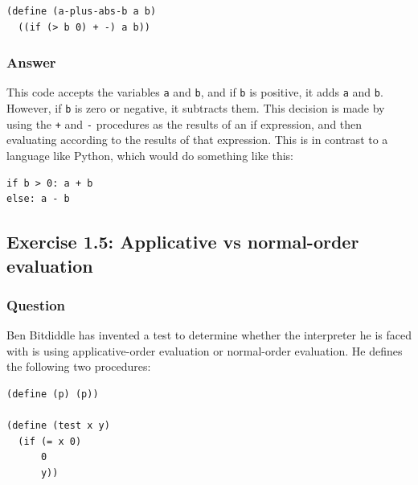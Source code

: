\documentclass[final,fleqn,titlepage,twoside]{article}
\begin{document}
\begin{verbatim}
(define (a-plus-abs-b a b)
  ((if (> b 0) + -) a b))
\end{verbatim}

\subsubsection{Answer}
\label{sec:orga450331}
This code accepts the variables \texttt{a} and \texttt{b}, and if
\texttt{b} is positive, it adds \texttt{a} and \texttt{b}. However, if
\texttt{b} is zero or negative, it subtracts them. This decision is made by
using the \texttt{+} and \texttt{-} procedures as the results of an if
expression, and then evaluating according to the results of that expression.
This is in contrast to a language like Python, which would do something like
this:

\begin{verbatim}
if b > 0: a + b
else: a - b
\end{verbatim}

\subsection{Exercise 1.5: Applicative vs normal-order evaluation}
\label{sec:orge310715}
\subsubsection{Question}
\label{sec:orgc2d97e5}
Ben Bitdiddle has invented a test to determine whether the interpreter he is
faced with is using applicative-order evaluation or normal-order evaluation. He
defines the following two procedures:

\begin{verbatim}
(define (p) (p))

(define (test x y)
  (if (= x 0)
      0
      y))
\end{verbatim}
\end{document}

